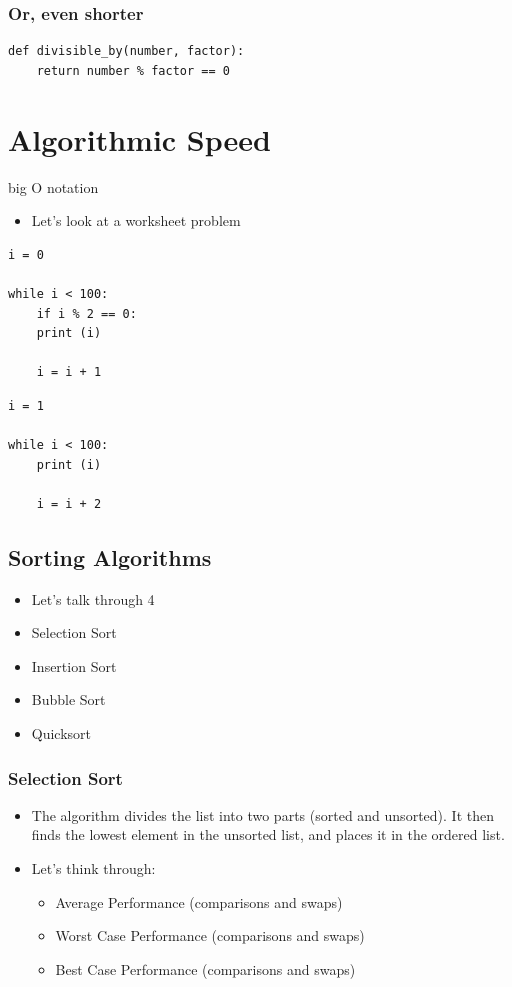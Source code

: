\documentclass[11pt]{article}
\begin{document}
\subsubsection{Or, even shorter}
\label{sec:org0de9958}
\begin{verbatim}
def divisible_by(number, factor):
    return number % factor == 0
\end{verbatim}
\section{Algorithmic Speed}
\label{sec:org0da8a37}
big O notation

\begin{itemize}
\item Let's look at a worksheet problem
\end{itemize}
\begin{verbatim}
i = 0

while i < 100:
    if i % 2 == 0:
	print (i)

    i = i + 1
\end{verbatim}

\begin{verbatim}
i = 1

while i < 100:
    print (i)

    i = i + 2
\end{verbatim}
\subsection{Sorting Algorithms}
\label{sec:orge34e9d4}
\begin{itemize}
\item Let's talk through 4
\item Selection Sort
\item Insertion Sort
\item Bubble Sort
\item Quicksort
\end{itemize}
\subsubsection{Selection Sort}
\label{sec:org5623c67}
\begin{itemize}
\item The algorithm divides the list into two parts (sorted and unsorted).  It then finds the lowest element in the unsorted list, and places it in the ordered list.
\item Let's think through:
\begin{itemize}
\item Average Performance (comparisons and swaps)
\item Worst Case Performance (comparisons and swaps)
\item Best Case Performance (comparisons and swaps)
\end{itemize}
\end{itemize}
\end{document}
